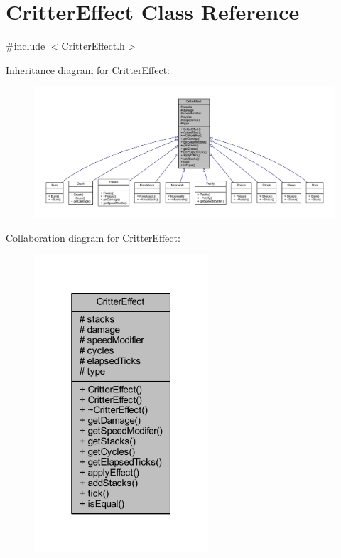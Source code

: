 \hypertarget{class_critter_effect}{\section{Critter\+Effect Class Reference}
\label{class_critter_effect}
}


{\ttfamily \#include $<$Critter\+Effect.\+h$>$}



Inheritance diagram for Critter\+Effect\+:
\nopagebreak
\begin{figure}[H]
\begin{center}
\leavevmode
\includegraphics[width=350pt]{class_critter_effect__inherit__graph}
\end{center}
\end{figure}


Collaboration diagram for Critter\+Effect\+:
\nopagebreak
\begin{figure}[H]
\begin{center}
\leavevmode
\includegraphics[width=184pt]{class_critter_effect__coll__graph}
\end{center}
\end{figure}

